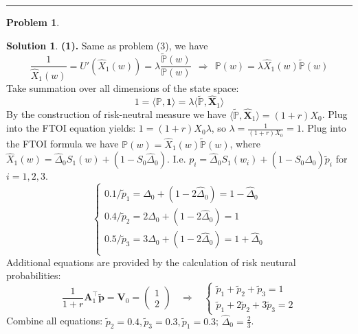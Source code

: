 \documentclass[a4paper, 10pt]{article}
\theoremstyle{definition}
\newtheorem{problem}{Problem}
\theoremstyle{hSol}
\newtheorem*{solution}{Solution}
\begin{document}
\noindent\rule{16cm}{0.4pt}
\begin{problem} 
\end{problem}
\begin{solution} \textbf{(1).} Same as problem (3), we have
\begin{equation}
	\frac{1}{\hat{X}_1(w)}= U'(\hat{X}_1(w)) = \lambda \frac{\tilde{\mathbb{P}}(w)}{\mathbb{P}(w)} ~~\Rightarrow~~\mathbb{P}\left(w\right) = \lambda \hat{X}_1(w) \tilde{\mathbb{P}}(w)
\end{equation}
Take summation over all dimensions of the state space:
\begin{equation}
	1 = \langle \mathbb{P}, \bm{1} \rangle = \lambda \langle \tilde{\mathbb{P}}, \hat{\bm{X}}_1 \rangle
\end{equation}
By the construction of risk-neutral measure we have $\langle \tilde{\mathbb{P}}, \hat{\bm{X}}_1 \rangle = (1+r)X_0$. Plug into the FTOI equation yields: $1 = (1+r)X_0 \lambda$, so $\lambda = \tfrac{1}{(1+r)X_0} = 1$. Plug into the FTOI formula we have $\mathbb{P}\left(w\right) = \hat{X}_1(w) \tilde{\mathbb{P}}(w)$, where $\hat{X}_1(w) = \hat{\Delta}_0 S_1(w) + (1-S_0\hat{\Delta}_0 )$. I.e. $p_i =  \hat{\Delta}_0 S_1(w_i) + (1-S_0\hat{\Delta}_0 )\tilde{p}_i$ for $i=1,2,3$.
\begin{equation}
	\begin{cases}
	0.1/\tilde{p}_1 = \hat{\Delta}_0 + (1-2\hat{\Delta}_0) = 1 - \hat{\Delta}_0\\
	0.4/\tilde{p}_2 = 2\hat{\Delta}_0 + (1-2\hat{\Delta}_0) = 1\\
	0.5/\tilde{p}_3 = 3\hat{\Delta}_0 + (1-2\hat{\Delta}_0) = 1+\hat{\Delta}_0\\
	\end{cases}
\end{equation}
Additional equations are provided by the calculation of risk neutural probabilities:
\begin{equation}
	\frac{1}{1+r}\bm{A}_1^{\top} \tilde{\bm{p}} = \bm{V}_0=\begin{pmatrix}1 \\ 2 \end{pmatrix} ~~~~\Rightarrow~~~~ \begin{cases}
	\tilde{p}_1 + \tilde{p}_2 + \tilde{p}_3 = 1\\
	\tilde{p}_1 + 2\tilde{p}_2 + 3\tilde{p}_3 = 2
	\end{cases}
\end{equation}
Combine all equations: $\tilde{p}_2 = 0.4, \tilde{p}_3 = 0.3, \tilde{p}_1 = 0.3$; $\hat{\Delta}_0=\frac{2}{3}$.\\

\end{solution}
\end{document}
